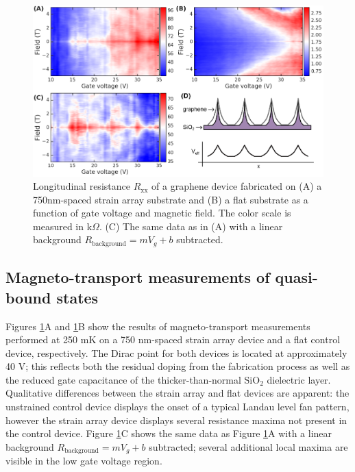 \documentclass[edeposit,fullpage,draftthesis]{uiucthesis2009}
\begin{document}
            \begin{figure}
            \centering
            \includegraphics[width=\columnwidth]{images/resultsanddiscussion/strainarraypaper/Figure4_1}
            \caption{
                Longitudinal resistance $R_\text{xx}$ of a graphene device fabricated on (A) a 750nm-spaced
                strain array substrate and (B) a flat substrate as a function of gate voltage and magnetic field. 
                The color scale is measured in k$\Omega$.
                (C) The same data as in (A) with a linear background $R_\text{background} = m V_g + b$ subtracted.
            }
            \label{'fig:transport'}
            \end{figure}
            
    \subsection{Magneto-transport measurements of quasi-bound states}
            
            Figures \ref{'fig:transport'}A and \ref{'fig:transport'}B show the results of magneto-transport 
            measurements performed at 250 mK on a 750 nm-spaced strain array device and a flat control device, respectively.
            The Dirac point for both devices is located at approximately 40 V; this reflects both the residual doping
            from the fabrication process as well as the reduced gate capacitance of the thicker-than-normal SiO$_2$ dielectric layer.
            Qualitative differences between the strain array and flat devices are apparent: 
            the unstrained control device displays the onset of a typical Landau level fan pattern\cite{bolotin2009observation}, 
            however the strain array device displays several resistance maxima not present in the control device.
            Figure \ref{'fig:transport'}C shows the same data as Figure \ref{'fig:transport'}A with a linear background 
            $R_\text{background} = m V_g + b$ subtracted; several additional local maxima are visible in the low gate voltage region.
            
\end{document}
